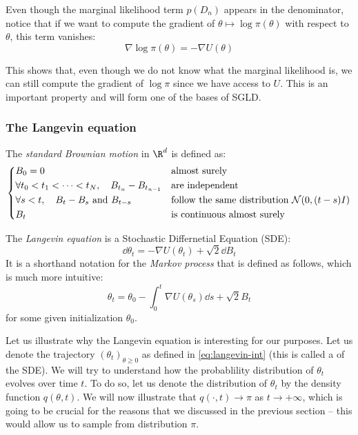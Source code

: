 \documentclass[toc, titlepaged]{../cs-classes/cs-classes}
\begin{document}
Even though the marginal likelihood term $p(D_n)$ appears in the denominator, notice that if we want to compute the gradient of $\theta\longmapsto\log\pi(\theta)$ with respect to $\theta$, this term vanishes:
\begin{equation*}
    \nabla\log\pi(\theta)=-\nabla U(\theta)
\end{equation*}

This shows that, even though we do not know what the marginal likelihood is, we can still compute the gradient of $\log\pi$ since we have access to $U$. This is an important property and will form one of the bases of SGLD.

\subsubsection{The Langevin equation}
\begin{definition}
    The \emph{standard Brownian motion} in $\R^d$ is defined as:
    \begin{equation}
        \begin{cases*}
            B_0=0 & almost surely\\
            \forall t_0<t_1<\dots<t_N,\quad B_{t_n}-B_{t_{n-1}} & are independent\\
            \forall s<t, \quad B_t-B_s \textnormal{ and } B_{t-s} & follow the same distribution $\mathcal{N}(0, (t-s)I)$\\
            B_t & is continuous almost surely
        \end{cases*}
    \end{equation}
\end{definition}

\begin{definition}
    The \emph{Langevin equation} is a Stochastic Differnetial Equation (SDE):
    \begin{equation}
        \dd\theta_t = -\nabla U(\theta_t)+\sqrt{2}\dd B_t
    \end{equation}
    It is a shorthand notation for the \emph{Markov process} that is defined as follows, which is much more intuitive:
    \begin{equation}
        \label{eq:langevin-int}
        \theta_t = \theta_0 - \int_0^t\nabla U(\theta_s)\dd s+\sqrt{2}B_t
    \end{equation}
    for some given initialization $\theta_0$.
\end{definition}

Let us illustrate why the Langevin equation is interesting for our purposes. Let us denote the trajectory $(\theta_t)_{\theta\geq0}$ as defined in \eqref{eq:langevin-int} (this is called a  of the SDE). We will try to understand how the probablility distribution of $\theta_t$ evolves over time $t$. To do so, let us denote the distribution of $\theta_t$ by the density function $q(\theta, t)$. We will now illustrate that $q(\cdot, t)\to\pi$ as $t\to+\infty$, which is going to be crucial for the reasons that we discussed in the previous section -- this would allow us to sample from distribution $\pi$.
\end{document}
